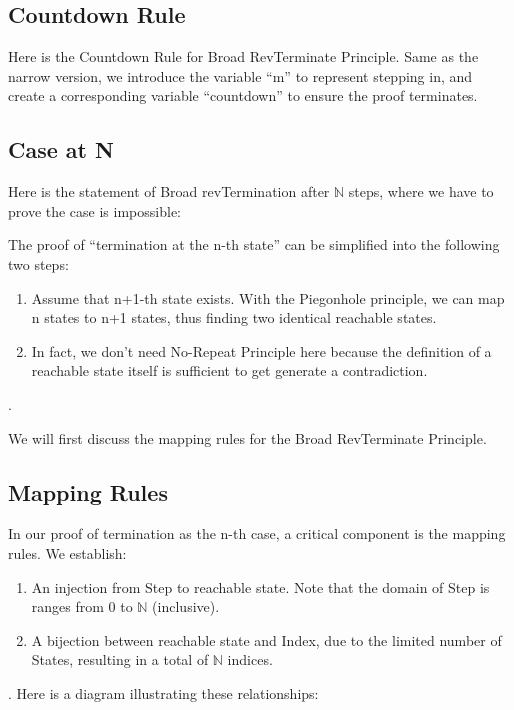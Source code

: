 \subsection{ Countdown Rule }
Here is the Countdown Rule for Broad RevTerminate Principle.
Same as the narrow version, we introduce the variable ``m'' to represent stepping in, and create a corresponding variable ``countdown'' to ensure the proof terminates.



\subsection{ Case at N }
Here is the statement of Broad revTermination after $\mathbb{N}$ steps, where we have to prove the case is impossible:



The proof of ``termination at the n-th state'' can be simplified into the following two steps:
\begin{enumerate}[1.]
    \item Assume that n+1-th state exists.  With the Piegonhole principle, we can map n states to n+1 states, thus finding two identical reachable states.
    \item In fact, we don't need No-Repeat Principle here because the definition of a reachable state itself is sufficient to get generate a contradiction.
\end{enumerate}.

We will first discuss the mapping rules for the Broad RevTerminate Principle.

\subsection{ Mapping Rules }
In our proof of termination as the n-th case, a critical component is the mapping rules.
We establish:
\begin{enumerate}[1.]
    \item An injection from Step to reachable state.  Note that the domain of Step is ranges from 0 to $\mathbb{N}$ (inclusive).
    \item A bijection between reachable state and Index, due to the limited number of States, resulting in a total of $\mathbb{N}$ indices.
\end{enumerate}.
Here is a diagram illustrating these relationships:

